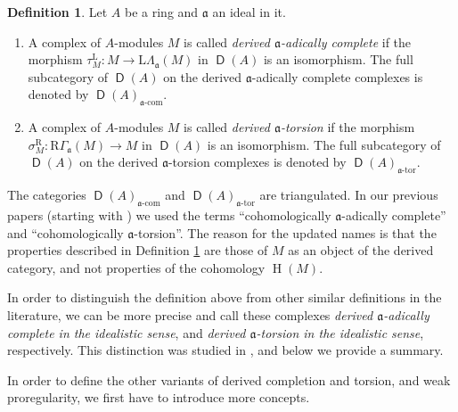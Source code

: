 \documentclass[10pt]{amsart}
\theoremstyle{definition}
\newtheorem{dfn}[equation]{Definition}
\numberwithin{equation}{section}
\newcommand{\opn}{\operatorname}
\newcommand{\cat}[1]{\operatorname{\mathsf{#1}}}
\newcommand{\mfrak}[1]{\mathfrak{#1}}
\newcommand{\mrm}[1]{\mathrm{#1}}
\newcommand{\Ga}{\Gamma}
\newcommand{\si}{\sigma}
\newcommand{\La}{\Lambda}
\renewcommand{\a}{\mfrak{a}}
\newcommand{\tup}[1]{\textrm{#1}}
\begin{document}
\begin{dfn} \label{dfn:270}
Let $A$ be a ring and $\a$ an ideal in it.
\begin{enumerate}
\item A complex of $A$-modules $M$ is called {\em derived $\a$-adically
complete} if the morphism
$\tau^{\mrm{L}}_M : M \to \mrm{L} \La_{\a}(M)$
in $\cat{D}(A)$ is an isomorphism.
The full subcategory of $\cat{D}(A)$ on the derived $\a$-adically complete
complexes is denoted by $\cat{D}(A)_{\tup{$\a$-com}}$.

\item A complex of $A$-modules $M$ is called {\em derived $\a$-torsion}
if the morphism
$\si^{\mrm{R}}_M : \mrm{R} \Ga_{\a}(M) \to M$
in $\cat{D}(A)$ is an isomorphism.
The full subcategory of $\cat{D}(A)$ on the derived $\a$-torsion
complexes is denoted by $\cat{D}(A)_{\tup{$\a$-tor}}$.
\end{enumerate}
\end{dfn}

The categories $\cat{D}(A)_{\tup{$\a$-com}}$ and
$\cat{D}(A)_{\tup{$\a$-tor}}$ are triangulated.
In our previous papers (starting with \cite{PSY1}) we used the terms
``cohomologically $\a$-adically
complete'' and ``cohomologically $\a$-torsion''.
The reason for the updated names is that the properties described in Definition
\ref{dfn:270} are those of $M$ as an object of the derived category, and not
properties of the cohomology $\opn{H}(M)$.

In order to distinguish the definition above from other similar definitions in
the literature, we can be more precise and call these complexes
{\em derived $\a$-adically complete in the idealistic sense}, and
{\em derived $\a$-torsion in the idealistic sense}, respectively.
This distinction was studied in \cite{Ye6}, and below we provide a summary.

In order to define the other variants of derived completion and torsion, and
weak proregularity, we first have to introduce more concepts.
\end{document}

